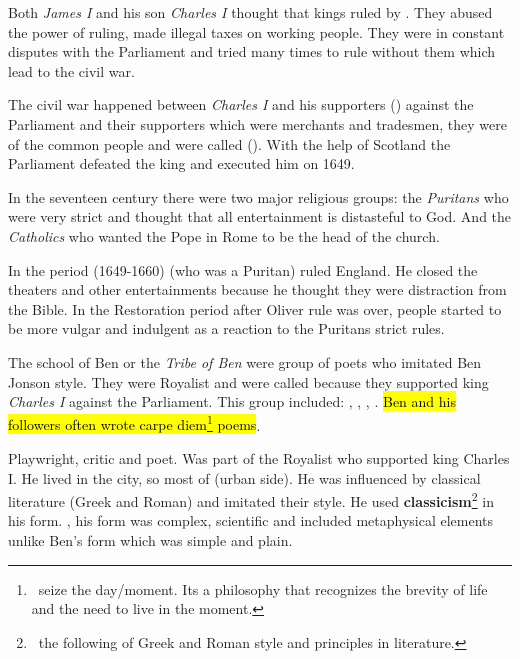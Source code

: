 

Both \textit{James I} and his son \textit{Charles I} thought that kings ruled 
by . They abused the power of ruling, made illegal taxes
on working people. They were in constant disputes with the Parliament and tried 
many times to rule without them which lead to the civil war.


The civil war happened between \textit{Charles I} and his supporters 
() against the Parliament and their supporters which were
merchants and tradesmen, they were of the common people and were called (). 
With the help of Scotland the Parliament defeated the king and executed him on 1649.


In the seventeen century there were two major religious groups: the
\textit{Puritans} who were very strict and thought that all entertainment is
distasteful to God. And the \textit{Catholics} who wanted the Pope in Rome to 
be the head of the church.\medbreak

In the period (1649-1660)  (who was a Puritan) ruled England. He closed the 
theaters and other entertainments because he thought they were distraction
from the Bible. In the Restoration period after Oliver rule was over, 
people started to be more vulgar and indulgent as a reaction to the Puritans strict rules.


The school of Ben or the \textit{Tribe of Ben} were group of poets who imitated
Ben Jonson style. They were Royalist and were called  because they
supported king \textit{Charles I} against the Parliament. This group included: 
, , 
, . \hl{Ben and his followers often wrote 
carpe diem\footnote{\, seize the day/moment. Its a philosophy that recognizes the brevity of life
and the need to live in the moment.} poems}.\medbreak


Playwright, critic and poet. Was part of the Royalist who supported 
king Charles I. He lived in the city, 
so most of  (urban side). He was influenced by classical 
literature (Greek and Roman) and imitated their style. He used
\textbf{classicism}\footnote{\, the following of Greek and Roman style and 
principles in literature.} 
in his form. , his 
form was complex, scientific and included metaphysical elements unlike
Ben's form which was simple and plain.



